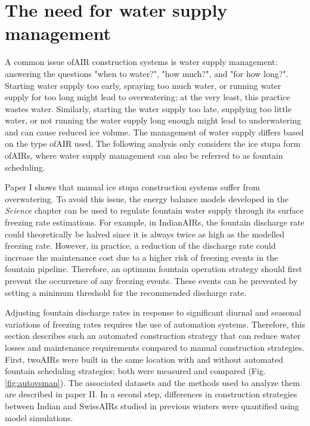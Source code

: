 \section{The need for water supply management}

A common issue of\ac{AIR} construction systems is water supply management: answering the questions "when to
water?", "how much?", and "for how long?". Starting water supply too early, spraying too much water, or
running water supply for too long might lead to overwatering; at the very least, this practice wastes water.
Similarly, starting the water supply too late, supplying too little water, or not running the water supply long
enough might lead to underwatering and can cause reduced ice volume. The management of water supply
differs based on the type of\ac{AIR} used. The following analysis only considers the ice stupa
form of\ac{AIRs}, where water supply management can also be referred to as fountain scheduling.

Paper I shows that manual ice stupa construction systems suffer from overwatering. To avoid this issue, the
energy balance models developed in the \textit{Science} chapter can be used to regulate fountain water supply
through its surface freezing rate estimations. For example, in Indian\ac{AIRs}, the fountain discharge rate could
theoretically be halved since it is always twice as high as the modelled freezing rate. However, in practice, a
reduction of the discharge rate could increase the maintenance cost due to a higher risk of freezing events in
the fountain pipeline. Therefore, an optimum fountain operation strategy should first prevent the occurrence of
any freezing events. These events can be prevented by setting a minimum threshold for the recommended discharge
rate.

Adjusting fountain discharge rates in response to significant diurnal and seasonal variations of freezing rates
requires the use of automation systems. Therefore, this section describes such an automated construction
strategy that can reduce water losses and maintenance requirements compared to manual construction strategies.
First, two\ac{AIRs} were built in the same location with and without automated fountain scheduling strategies; both
were measured and compared (Fig. \ref{fig:autovsman}). The associated datasets and the methods used to analyze
them are described in paper II. In a second step, differences in construction strategies between Indian and
Swiss\ac{AIRs} studied in previous winters were quantified using model simulations. 

